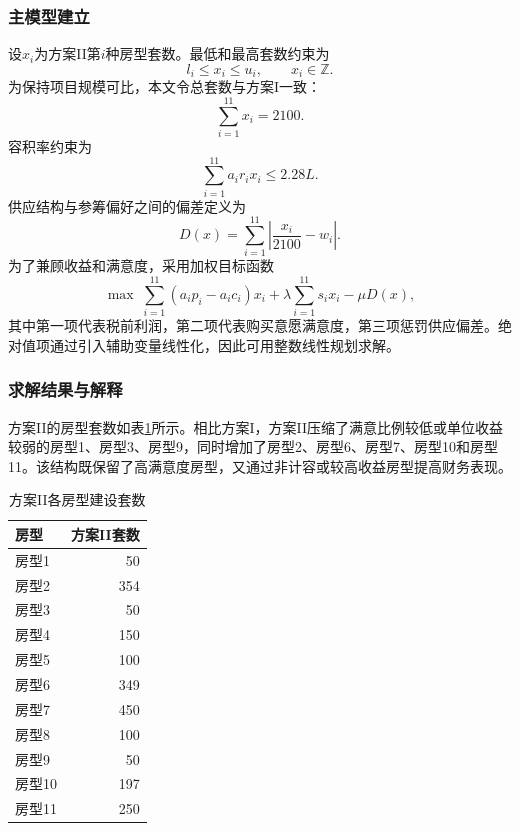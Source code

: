 \documentclass[UTF8,12pt,a4paper]{ctexart}
\begin{document}
\subsubsection{主模型建立}
设$x_i$为方案II第$i$种房型套数。最低和最高套数约束为
\begin{equation}
l_i\leq x_i\leq u_i,\qquad x_i\in \mathbb{Z}.
\end{equation}
为保持项目规模可比，本文令总套数与方案I一致：
\begin{equation}
\sum_{i=1}^{11}x_i=2100.
\end{equation}
容积率约束为
\begin{equation}
\sum_{i=1}^{11} a_i r_i x_i \leq 2.28L.
\end{equation}
供应结构与参筹偏好之间的偏差定义为
\begin{equation}
D(x)=\sum_{i=1}^{11}\left|\frac{x_i}{2100}-w_i\right|.
\end{equation}
为了兼顾收益和满意度，采用加权目标函数
\begin{equation}
\max \; \sum_{i=1}^{11}(a_ip_i-a_ic_i)x_i+\lambda\sum_{i=1}^{11}s_ix_i-\mu D(x),
\end{equation}
其中第一项代表税前利润，第二项代表购买意愿满意度，第三项惩罚供应偏差。绝对值项通过引入辅助变量线性化，因此可用整数线性规划求解。

\subsubsection{求解结果与解释}
方案II的房型套数如表\ref{tab:units}所示。相比方案I，方案II压缩了满意比例较低或单位收益较弱的房型1、房型3、房型9，同时增加了房型2、房型6、房型7、房型10和房型11。该结构既保留了高满意度房型，又通过非计容或较高收益房型提高财务表现。

\begin{table}[H]\centering\caption{方案II各房型建设套数}\label{tab:units}
\begin{tabular}{lr}\toprule
房型 & 方案II套数\\\midrule
房型1 & 50 \\
房型2 & 354 \\
房型3 & 50 \\
房型4 & 150 \\
房型5 & 100 \\
房型6 & 349 \\
房型7 & 450 \\
房型8 & 100 \\
房型9 & 50 \\
房型10 & 197 \\
房型11 & 250 \\
\bottomrule\end{tabular}\end{table}
\end{document}
